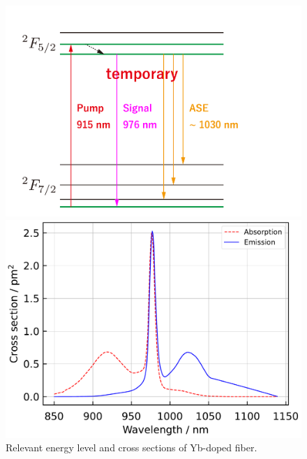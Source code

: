 \documentclass{osa-article}
\begin{document}
\begin{figure}[h!]
  \begin{minipage}[b]{0.5\linewidth}
    \centering
    \includegraphics[keepaspectratio, width=0.9\linewidth]{./Figure/RelevantEnergyLevelOfYb3+InAluminosilicate}
  \end{minipage}
  \begin{minipage}[b]{0.5\linewidth}
    \centering
    \includegraphics[keepaspectratio, width=0.9\linewidth]{./Figure/CrossSectionOfYb3+InAluminosilicate}
  \end{minipage}
  \caption{Relevant energy level and cross sections of Yb-doped fiber.}
  \label{fig:EnergylevelAndCrosssectionOfYb3+}
\end{figure}
\end{document}
